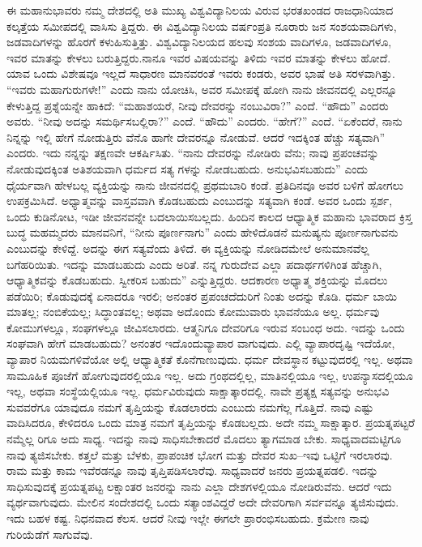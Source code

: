 ಈ ಮಹಾನುಭಾವರು ನಮ್ಮ ದೇಶದಲ್ಲಿ ಅತಿ ಮುಖ್ಯ ವಿಶ್ವವಿದ್ಯಾನಿಲಯ ವಿರುವ ಭರತಖಂಡದ ರಾಜಧಾನಿಯಾದ ಕಲ್ಕತ್ತೆಯ ಸಮೀಪದಲ್ಲಿ ವಾಸಿಸು ತ್ತಿದ್ದರು. ಈ ವಿಶ್ವವಿದ್ಯಾನಿಲಯ ವರ್ಷಂಪ್ರತಿ ನೂರಾರು ಜನ ಸಂಶಯವಾದಿಗಳು, ಜಡವಾದಿಗಳನ್ನು ಹೊರಗೆ ಕಳುಹಿಸುತ್ತಿತ್ತು. ವಿಶ್ವವಿದ್ಯಾನಿಲಯದ ಹಲವು ಸಂಶಯ ವಾದಿಗಳೂ, ಜಡವಾದಿಗಳೂ, ಇವರ ಮಾತನ್ನು ಕೇಳಲು ಬರುತ್ತಿದ್ದರು.ನಾನೂ ಇವರ ವಿಷಯವನ್ನು ತಿಳಿದು ಇವರ ಮಾತನ್ನು ಕೇಳಲು ಹೋದೆ. ಯಾವ ಒಂದು ವಿಶೇಷವೂ ಇಲ್ಲದೆ ಸಾಧಾರಣ ಮಾನವರಂತೆ ಇವರು ಕಂಡರು, ಅವರ ಭಾಷೆ ಅತಿ ಸರಳವಾಗಿತ್ತು. “ಇವರು ಮಹಾಗುರುಗಳೇ!” ಎಂದು ನಾನು ಯೋಚಿಸಿ, ಅವರ ಸಮೀಪಕ್ಕೆ ಹೋಗಿ ನಾನು ಜೀವನದಲ್ಲಿ ಎಲ್ಲರನ್ನೂ ಕೇಳುತ್ತಿದ್ದ ಪ್ರಶ್ನೆಯನ್ನೇ ಹಾಕಿದೆ: “ಮಹಾಶಯರೆ, ನೀವು ದೇವರನ್ನು ನಂಬುವಿರಾ?” ಎಂದೆ. “ಹೌದು” ಎಂದರು ಅವರು. “ನೀವು ಅದನ್ನು ಸಮರ್ಥಿಸಬಲ್ಲಿರಾ?” ಎಂದೆ. “ಹೌದು” ಎಂದರು. “ಹೇಗೆ?” ಎಂದೆ. “ಏಕೆಂದರೆ, ನಾನು ನಿನ್ನನ್ನು ಇಲ್ಲಿ ಹೇಗೆ ನೋಡುತ್ತಿರು ವೆನೊ ಹಾಗೇ ದೇವರನ್ನೂ ನೋಡುವೆ. ಆದರೆ ಇದಕ್ಕಿಂತ ಹೆಚ್ಚು ಸತ್ಯವಾಗಿ” ಎಂದರು. ಇದು ನನ್ನನ್ನು ತಕ್ಷಣವೇ ಆಕರ್ಷಿಸಿತು. “ನಾನು ದೇವರನ್ನು ನೋಡಿರು ವೆನು; ನಾವು ಪ್ರಪಂಚವನ್ನು ನೋಡುವುದಕ್ಕಿಂತ ಅತಿಶಯವಾಗಿ ಧರ್ಮದ ಸತ್ಯ ಗಳನ್ನು ನೋಡಬಹುದು. ಅನುಭವಿಸಬಹುದು” ಎಂದು ಧೈರ್ಯವಾಗಿ ಹೇಳಬಲ್ಲ ವ್ಯಕ್ತಿಯನ್ನು ನಾನು ಜೀವನದಲ್ಲಿ ಪ್ರಥಮಬಾರಿ ಕಂಡೆ. ಪ್ರತಿದಿನವೂ ಅವರ ಬಳಿಗೆ ಹೋಗಲು ಉಪಕ್ರಮಿಸಿದೆ. ಅಧ್ಯಾತ್ಮವನ್ನು ವಾಸ್ತವವಾಗಿ ಕೊಡಬಹುದು ಎಂಬುದನ್ನು ಸತ್ಯವಾಗಿ ಕಂಡೆ. ಅವರ ಒಂದು ಸ್ಪರ್ಶ, ಒಂದು ಕುಡಿನೋಟ, ಇಡೀ ಜೀವನವನ್ನೇ ಬದಲಾಯಿಸಬಲ್ಲದು. ಹಿಂದಿನ ಕಾಲದ ಆಧ್ಯಾತ್ಮಿಕ ಮಹಾನು ಭಾವರಾದ ಕ್ರಿಸ್ತ ಬುದ್ಧ ಮಹಮ್ಮದರು ಮಾನವನಿಗೆ, “ನೀನು ಪೂರ್ಣನಾಗು” ಎಂದು ಹೇಳಿದೊಡನೆ ಮನುಷ್ಯನು ಪೂರ್ಣನಾಗುವನು ಎಂಬುದನ್ನು ಕೇಳಿದ್ದೆ. ಅದನ್ನು ಈಗ ಸತ್ಯವೆಂದು ತಿಳಿದೆ. ಈ ವ್ಯಕ್ತಿಯನ್ನು ನೋಡಿದಮೇಲೆ ಅನುಮಾನವೆಲ್ಲ ಬಗೆಹರಿಯಿತು. ಇದನ್ನು ಮಾಡಬಹುದು ಎಂದು ಅರಿತೆ. ನನ್ನ ಗುರುದೇವ ಎಲ್ಲಾ ಪದಾರ್ಥಗಳಿಗಿಂತ ಹೆಚ್ಚಾಗಿ, ಆಧ್ಯಾತ್ಮಿಕವನ್ನು ಕೊಡಬಹುದು. ಸ್ವೀಕರಿಸ ಬಹುದು” ಎನ್ನುತ್ತಿದ್ದರು. ಆದಕಾರಣ ಅಧ್ಯಾತ್ಮ ಶಕ್ತಿಯನ್ನು ಮೊದಲು ಪಡೆಯಿರಿ; ಕೊಡುವುದಕ್ಕೆ ಏನಾದರೂ ಇರಲಿ; ಅನಂತರ ಪ್ರಪಂಚದೆದುರಿಗೆ ನಿಂತು ಅದನ್ನು ಕೊಡಿ. ಧರ್ಮ ಬಾಯಿ ಮಾತಲ್ಲ; ನಂಬಿಕೆಯಲ್ಲ; ಸಿದ್ಧಾಂತವಲ್ಲ; ಅಥವಾ ಅದೊಂದು ಕೋಮುವಾರು ಭಾವನೆಯೂ ಅಲ್ಲ. ಧರ್ಮವು ಕೋಮುಗಳಲ್ಲೂ, ಸಂಘಗಳಲ್ಲೂ ಜೀವಿಸಲಾರದು. ಆತ್ಮನಿಗೂ ದೇವರಿಗೂ ಇರುವ ಸಂಬಂಧ ಅದು. ಇದನ್ನು ಒಂದು ಸಂಘವಾಗಿ ಹೇಗೆ ಮಾಡಬಹುದು? ಅನಂತರ ಇದೊಂದುವ್ಯಾಪಾರ ವಾಗುವುದು. ಎಲ್ಲಿ ವ್ಯಾಪಾರದೃಷ್ಟಿ ಇದೆಯೋ, ವ್ಯಾಪಾರ ನಿಯಮಗಳಿವೆಯೋ ಅಲ್ಲಿ ಆಧ್ಯಾತ್ಮಿಕತೆ ಕೊನೆಗಾಣುವುದು. ಧರ್ಮ ದೇವಸ್ಥಾನ ಕಟ್ಟುವುದರಲ್ಲಿ ಇಲ್ಲ. ಅಥವಾ ಸಾಮೂಹಿಕ ಪೂಜೆಗೆ ಹೋಗುವುದರಲ್ಲಿಯೂ ಇಲ್ಲ. ಅದು ಗ್ರಂಥದಲ್ಲಿಲ್ಲ, ಮಾತಿನಲ್ಲಿಯೂ ಇಲ್ಲ, ಉಪನ್ಯಾಸದಲ್ಲಿಯೂ ಇಲ್ಲ, ಅಥವಾ ಸಂಸ್ಥೆಯಲ್ಲಿಯೂ ಇಲ್ಲ. ಧರ್ಮವಿರುವುದು ಸಾಕ್ಷಾತ್ಕಾರದಲ್ಲಿ. ನಾವೇ ಪ್ರತ್ಯಕ್ಷ ಸತ್ಯವನ್ನು ಅನುಭವಿ ಸುವವರೆಗೂ ಯಾವುದೂ ನಮಗೆ ತೃಪ್ತಿಯನ್ನು ಕೊಡಲಾರದು ಎಂಬುದು ನಮಗೆಲ್ಲ ಗೊತ್ತಿದೆ. ನಾವು ಎಷ್ಟು ವಾದಿಸಿದರೂ, ಕೇಳಿದರೂ ಒಂದು ಮಾತ್ರ ನಮಗೆ ತೃಪ್ತಿಯನ್ನು ಕೊಡಬಲ್ಲದು. ಅದೇ ನಮ್ಮ ಸಾಕ್ಷಾತ್ಕಾರ. ಪ್ರಯತ್ನಪಟ್ಟರೆ ನಮ್ಮೆಲ್ಲ ರಿಗೂ ಅದು ಸಾಧ್ಯ. ಇದನ್ನು ನಾವು ಸಾಧಿಸಬೇಕಾದರೆ ಮೊದಲು ತ್ಯಾಗಮಾಡ ಬೇಕು. ಸಾಧ್ಯವಾದಮಟ್ಟಿಗೂ ನಾವು ತ್ಯಜಿಸಬೇಕು. ಕತ್ತಲೆ ಮತ್ತು ಬೆಳಕು, ಪ್ರಾಪಂಚಿಕ ಭೋಗ ಮತ್ತು ದೇವರ ಸುಖ–ಇವು ಒಟ್ಟಿಗೆ ಇರಲಾರವು. ರಾಮ ಮತ್ತು ಕಾಮ ಇವೆರಡನ್ನೂ ನಾವು ತೃಪ್ತಿಪಡಿಸಲಾರೆವು. ಸಾಧ್ಯವಾದರೆ ಜನರು ಪ್ರಯತ್ನಪಡಲಿ. ಇದನ್ನು ಸಾಧಿಸುವುದಕ್ಕೆ ಪ್ರಯತ್ನಪಟ್ಟ ಲಕ್ಷಾಂತರ ಜನರನ್ನು ನಾನು ಎಲ್ಲಾ ದೇಶಗಳಲ್ಲಿಯೂ ನೋಡಿರುವೆನು. ಆದರೆ ಇದು ವ್ಯರ್ಥವಾಗುವುದು. ಮೇಲಿನ ಸಂದೇಶದಲ್ಲಿ ಒಂದು ಸತ್ಯಾಂಶವಿದ್ದರೆ ಅದೇ ದೇವರಿಗಾಗಿ ಸರ್ವವನ್ನೂ ತ್ಯಜಿಸುವುದು. ಇದು ಬಹಳ ಕಷ್ಟ. ನಿಧನವಾದ ಕೆಲಸ. ಆದರೆ ನೀವು ಇಲ್ಲೇ ಈಗಲೇ ಪ್ರಾರಂಭಿಸಬಹುದು. ಕ್ರಮೇಣ ನಾವು ಗುರಿಯೆಡೆಗೆ ಸಾಗುವೆವು.


